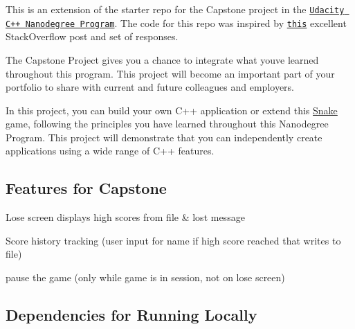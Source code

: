 This is an extension of the starter repo for the Capstone project in the \href{https://www.udacity.com/course/c-plus-plus-nanodegree--nd213}{\tt Udacity C++ Nanodegree Program}. The code for this repo was inspired by \href{https://codereview.stackexchange.com/questions/212296/snake-game-in-c-with-sdl}{\tt this} excellent Stack\+Overflow post and set of responses.



The Capstone Project gives you a chance to integrate what you\textquotesingle{}ve learned throughout this program. This project will become an important part of your portfolio to share with current and future colleagues and employers.

In this project, you can build your own C++ application or extend this \hyperlink{classSnake}{Snake} game, following the principles you have learned throughout this Nanodegree Program. This project will demonstrate that you can independently create applications using a wide range of C++ features.

\subsection*{Features for Capstone}


\begin{DoxyItemize}
\item Lose screen displays high scores from file \& lost message
\item Score history tracking (user input for name if high score reached that writes to file)
\item pause the game (only while game is in session, not on lose screen)
\end{DoxyItemize}

\subsection*{Dependencies for Running Locally}


